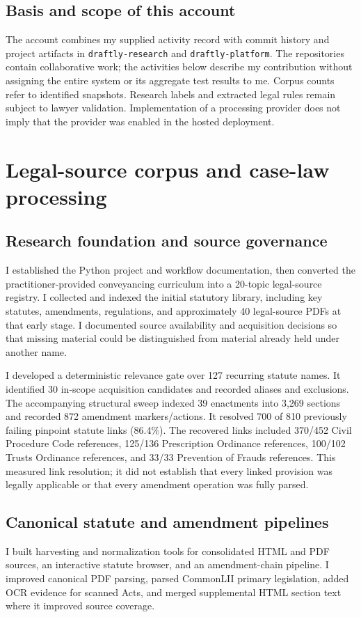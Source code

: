 \documentclass[11pt,a4paper]{article}
\newcommand{\repo}[1]{\texttt{\nolinkurl{#1}}}
\begin{document}
\subsection{Basis and scope of this account}
The account combines my supplied activity record with commit history and project artifacts in \repo{draftly-research} and \repo{draftly-platform}. The repositories contain collaborative work; the activities below describe my contribution without assigning the entire system or its aggregate test results to me. Corpus counts refer to identified snapshots. Research labels and extracted legal rules remain subject to lawyer validation. Implementation of a processing provider does not imply that the provider was enabled in the hosted deployment.

\newpage
\section{Legal-source corpus and case-law processing}
\subsection{Research foundation and source governance}
I established the Python project and workflow documentation, then converted the practitioner-provided conveyancing curriculum into a 20-topic legal-source registry. I collected and indexed the initial statutory library, including key statutes, amendments, regulations, and approximately 40 legal-source PDFs at that early stage. I documented source availability and acquisition decisions so that missing material could be distinguished from material already held under another name.

I developed a deterministic relevance gate over 127 recurring statute names. It identified 30 in-scope acquisition candidates and recorded aliases and exclusions. The accompanying structural sweep indexed 39 enactments into 3,269 sections and recorded 872 amendment markers/actions. It resolved 700 of 810 previously failing pinpoint statute links (86.4\%). The recovered links included 370/452 Civil Procedure Code references, 125/136 Prescription Ordinance references, 100/102 Trusts Ordinance references, and 33/33 Prevention of Frauds references. This measured link resolution; it did not establish that every linked provision was legally applicable or that every amendment operation was fully parsed.

\subsection{Canonical statute and amendment pipelines}
I built harvesting and normalization tools for consolidated HTML and PDF sources, an interactive statute browser, and an amendment-chain pipeline. I improved canonical PDF parsing, parsed CommonLII primary legislation, added OCR evidence for scanned Acts, and merged supplemental HTML section text where it improved source coverage.
\end{document}
